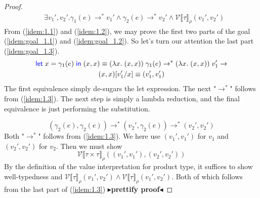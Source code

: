 \documentclass[twoside,11pt,openright]{report}
\theoremstyle{definition}
\newcommand{\var}{x}
\newcommand{\expr}{e}
\newcommand{\val}{v}
\newcommand{\subst}[3]{#1{\left[#3 \middle/ #2 \right]}}
\newcommand{\Tprod}[2]{#1 \times #2}
\newcommand{\typ}{\tau}
\newcommand{\step}{\rightarrow}
\newcommand{\stepS}{\rightarrow^*}
\newcommand{\ValInp}[2]{\mathcal{V} \llbracket #1 \rrbracket_{#2}}
\newcommand{\todo}[1]{{\color[rgb]{.5,0,0}\textbf{$\blacktriangleright$#1$\blacktriangleleft$}}}
\begin{document}
\begin{proof}
\begin{align}
    &\exists \val_1', \val_2' . \gamma_1(\expr) \stepS \val_1' \land \gamma_2(\expr) \stepS \val_2' \land\ValInp{\typ}{\rho}(\val_1', \val_2')\label{idem:1.3}
  \end{align}
  From (\ref*{idem:1.1}) and (\ref*{idem:1.2}), we may prove the first two parts of the goal (\ref*{idem:goal_1.1}) and (\ref*{idem:goal_1.2}). So let's turn our attention the last part (\ref*{idem:goal_1.3}).
  \begin{multline}
    \Let \var = \gamma_1(\expr) in (\var, \var) \equiv (\fun \var . (\var, \var)) \; \gamma_1(\expr) \stepS (\fun \var . (\var, \var)) \; \val_1' \step\\ \subst{(\var, \var)}{\var}{\val_1'} \equiv (\val_1', \val_1')
  \end{multline}
  The first equivalence simply de-sugars the let expression. The next "$\stepS$" follows from (\ref{idem:1.3}). The next step is simply a lambda reduction, and the final equivalence is just performing the substitution.

  \begin{equation}
    (\gamma_2(\expr), \gamma_2(\expr)) \stepS (\val_2', \gamma_2(\expr)) \stepS (\val_2', \val_2')
  \end{equation}
  Both "$\stepS$" follows from (\ref{idem:1.3}).
  We here use $(\val_1', \val_1')$ for $\val_1$ and $(\val_2', \val_2')$ for $\val_2$. Then we must show
  \begin{equation}
    \ValInp{\Tprod{\typ}{\typ}}{\rho}((\val_1', \val_1'), (\val_2', \val_2'))\label{idem:goal_final}
  \end{equation}
  By the definition of the value interpretation for product type, it suffices to show well-typedness and $\ValInp{\typ}{\rho}(\val_1', \val_2') \land \ValInp{\typ}{\rho}(\val_1', \val_2')$. Both of which follows from the last part of (\ref{idem:1.3})
  \todo{prettify proof}
\end{proof}
\end{document}

